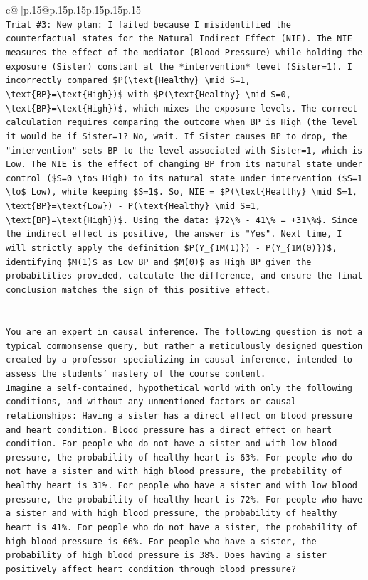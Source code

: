 \documentclass{article}
\begin{document}
{\begin{supertabular}{c@{$\;$}|p{.15\linewidth}@{}p{.15\linewidth}p{.15\linewidth}p{.15\linewidth}p{.15\linewidth}p{.15\linewidth}}
{{{\\ 
\texttt{Trial \#3: New plan: I failed because I misidentified the counterfactual states for the Natural Indirect Effect (NIE). The NIE measures the effect of the mediator (Blood Pressure) while holding the exposure (Sister) constant at the *intervention* level (Sister=1). I incorrectly compared \$P(\textbackslash{}text\{Healthy\} \textbackslash{}mid S=1, \textbackslash{}text\{BP\}=\textbackslash{}text\{High\})\$ with \$P(\textbackslash{}text\{Healthy\} \textbackslash{}mid S=0, \textbackslash{}text\{BP\}=\textbackslash{}text\{High\})\$, which mixes the exposure levels. The correct calculation requires comparing the outcome when BP is High (the level it would be if Sister=1? No, wait. If Sister causes BP to drop, the "intervention" sets BP to the level associated with Sister=1, which is Low. The NIE is the effect of changing BP from its natural state under control (\$S=0 \textbackslash{}to\$ High) to its natural state under intervention (\$S=1 \textbackslash{}to\$ Low), while keeping \$S=1\$. So, NIE = \$P(\textbackslash{}text\{Healthy\} \textbackslash{}mid S=1, \textbackslash{}text\{BP\}=\textbackslash{}text\{Low\}) {-} P(\textbackslash{}text\{Healthy\} \textbackslash{}mid S=1, \textbackslash{}text\{BP\}=\textbackslash{}text\{High\})\$. Using the data: \$72\textbackslash{}\% {-} 41\textbackslash{}\% = +31\textbackslash{}\%\$. Since the indirect effect is positive, the answer is "Yes". Next time, I will strictly apply the definition \$P(Y\_\{1M(1)\}) {-} P(Y\_\{1M(0)\})\$, identifying \$M(1)\$ as Low BP and \$M(0)\$ as High BP given the probabilities provided, calculate the difference, and ensure the final conclusion matches the sign of this positive effect.} \\
\\ 
\\ 
\texttt{You are an expert in causal inference. The following question is not a typical commonsense query, but rather a meticulously designed question created by a professor specializing in causal inference, intended to assess the students' mastery of the course content.} \\
\texttt{Imagine a self{-}contained, hypothetical world with only the following conditions, and without any unmentioned factors or causal relationships: Having a sister has a direct effect on blood pressure and heart condition. Blood pressure has a direct effect on heart condition. For people who do not have a sister and with low blood pressure, the probability of healthy heart is 63\%. For people who do not have a sister and with high blood pressure, the probability of healthy heart is 31\%. For people who have a sister and with low blood pressure, the probability of healthy heart is 72\%. For people who have a sister and with high blood pressure, the probability of healthy heart is 41\%. For people who do not have a sister, the probability of high blood pressure is 66\%. For people who have a sister, the probability of high blood pressure is 38\%. Does having a sister positively affect heart condition through blood pressure?} \\
}}}
\end{supertabular}}
\end{document}

